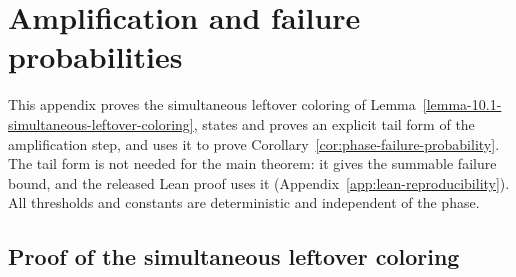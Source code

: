 \documentclass[a4paper,10pt,reqno]{amsart}
\numberwithin{equation}{section}
\theoremstyle{plain}
\theoremstyle{remark}
\begin{document}
\section{Amplification and failure probabilities}
\label{app:amplification}

This appendix proves the simultaneous leftover coloring of
Lemma~\ref{lemma-10.1-simultaneous-leftover-coloring}, states and proves an
explicit tail form of the amplification step, and uses it to prove
Corollary~\ref{cor:phase-failure-probability}. The tail form is not needed
for the main theorem: it gives the summable failure bound, and the released
Lean proof uses it (Appendix~\ref{app:lean-reproducibility}). All thresholds
and constants are deterministic and independent of the phase.

\subsection{Proof of the simultaneous leftover coloring}
\label{app:leftover-coloring-proof}
\end{document}
